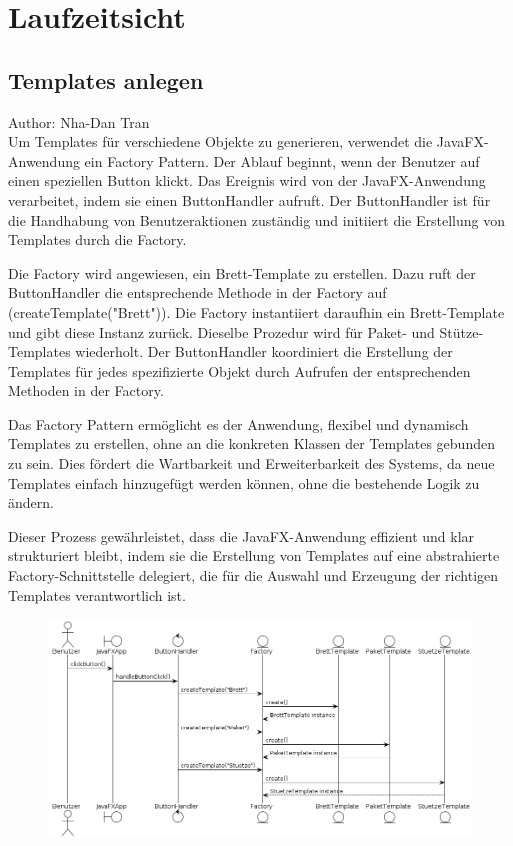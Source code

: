 \section{Laufzeitsicht}
\subsection{Templates anlegen}
Author: Nha-Dan Tran\\
Um Templates für verschiedene Objekte zu generieren, verwendet die JavaFX-Anwendung ein Factory Pattern. Der Ablauf beginnt, wenn der Benutzer auf einen speziellen Button klickt. Das Ereignis wird von der JavaFX-Anwendung verarbeitet, indem sie einen ButtonHandler aufruft. Der ButtonHandler ist für die Handhabung von Benutzeraktionen zuständig und initiiert die Erstellung von Templates durch die Factory.

Die Factory wird angewiesen, ein Brett-Template zu erstellen. Dazu ruft der ButtonHandler die entsprechende Methode in der Factory auf (createTemplate("Brett")). Die Factory instantiiert daraufhin ein Brett-Template und gibt diese Instanz zurück. Dieselbe Prozedur wird für Paket- und Stütze-Templates wiederholt. Der ButtonHandler koordiniert die Erstellung der Templates für jedes spezifizierte Objekt durch Aufrufen der entsprechenden Methoden in der Factory.

Das Factory Pattern ermöglicht es der Anwendung, flexibel und dynamisch Templates zu erstellen, ohne an die konkreten Klassen der Templates gebunden zu sein. Dies fördert die Wartbarkeit und Erweiterbarkeit des Systems, da neue Templates einfach hinzugefügt werden können, ohne die bestehende Logik zu ändern.

Dieser Prozess gewährleistet, dass die JavaFX-Anwendung effizient und klar strukturiert bleibt, indem sie die Erstellung von Templates auf eine abstrahierte Factory-Schnittstelle delegiert, die für die Auswahl und Erzeugung der richtigen Templates verantwortlich ist.


\begin{figure}[H]
    \includegraphics[width=\linewidth]{images/laufzeitsicht/laufzeitsichtTemplates.png}
    \label{fig:templateLaufzeit}
\end{figure}

